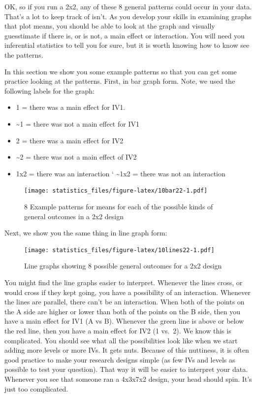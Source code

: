 \documentclass[]{book}
\providecommand{\tightlist}{%
  \setlength{\itemsep}{0pt}\setlength{\parskip}{0pt}}
\begin{document}
OK, so if you run a 2x2, any of these 8 general patterns could occur in your data. That's a lot to keep track of isn't. As you develop your skills in examining graphs that plot means, you should be able to look at the graph and visually guesstimate if there is, or is not, a main effect or interaction. You will need you inferential statistics to tell you for sure, but it is worth knowing how to know see the patterns.

In this section we show you some example patterns so that you can get some practice looking at the patterns. First, in bar graph form. Note, we used the following labels for the graph:

\begin{itemize}
\tightlist
\item
  1 = there was a main effect for IV1.
\item
  \textasciitilde{}1 = there was not a main effect for IV1
\item
  2 = there was a main effect for IV2
\item
  \textasciitilde{}2 = there was not a main effect of IV2
\item
  1x2 = there was an interaction
  ` \textasciitilde{}1x2 = there was not an interaction
\end{itemize}

\begin{figure}
\centering
\texttt{[image: statistics\_files/figure-latex/10bar22-1.pdf]}
\caption{\label{fig:10bar22}8 Example patterns for means for each of the possible kinds of general outcomes in a 2x2 design}
\end{figure}

Next, we show you the same thing in line graph form:

\begin{figure}
\centering
\texttt{[image: statistics\_files/figure-latex/10lines22-1.pdf]}
\caption{\label{fig:10lines22}Line graphs showing 8 possible general outcomes for a 2x2 design}
\end{figure}

You might find the line graphs easier to interpret. Whenever the lines cross, or would cross if they kept going, you have a possibility of an interaction. Whenever the lines are parallel, there can't be an interaction. When both of the points on the A side are higher or lower than both of the points on the B side, then you have a main effect for IV1 (A vs B). Whenever the green line is above or below the red line, then you have a main effect for IV2 (1 vs.~2). We know this is complicated. You should see what all the possibilities look like when we start adding more levels or more IVs. It gets nuts. Because of this nuttiness, it is often good practice to make your research designs simple (as few IVs and levels as possible to test your question). That way it will be easier to interpret your data. Whenever you see that someone ran a 4x3x7x2 design, your head should spin. It's just too complicated.
\end{document}
